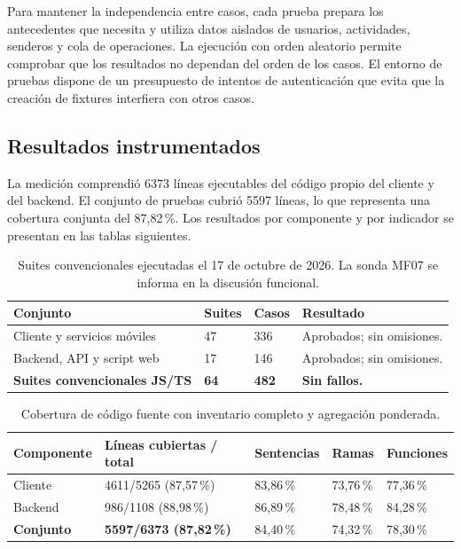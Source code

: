 Para mantener la independencia entre casos, cada prueba prepara los antecedentes que necesita y utiliza datos aislados de usuarios, actividades, senderos y cola de operaciones. La ejecución con orden aleatorio permite comprobar que los resultados no dependan del orden de los casos. El entorno de pruebas dispone de un presupuesto de intentos de autenticación que evita que la creación de fixtures interfiera con otros casos.

\subsection{Resultados instrumentados}

La medición comprendió 6373 líneas ejecutables del código propio del cliente y del backend. El conjunto de pruebas cubrió 5597 líneas, lo que representa una cobertura conjunta del 87{,}82\,\%. Los resultados por componente y por indicador se presentan en las tablas siguientes.

\begin{table}[H]
\centering
\small
\setlength{\tabcolsep}{4pt}
\renewcommand{\arraystretch}{1.15}
\begin{tabular}{|p{4.6cm}|p{2cm}|p{2cm}|p{4cm}|}
\hline
\textbf{Conjunto} & \textbf{Suites} & \textbf{Casos} & \textbf{Resultado} \\
\hline
Cliente y servicios móviles & 47 & 336 & Aprobados; sin omisiones. \\
\hline
Backend, API y script web & 17 & 146 & Aprobados; sin omisiones. \\
\hline
\textbf{Suites convencionales JS/TS} & \textbf{64} & \textbf{482} & \textbf{Sin fallos.} \\
\hline
\end{tabular}
\caption{Suites convencionales ejecutadas el 17 de octubre de 2026. La sonda MF07 se informa en la discusión funcional.}
\label{tab:resultados-pruebas}
\end{table}

\begin{table}[H]
\centering
\small
\setlength{\tabcolsep}{4pt}
\renewcommand{\arraystretch}{1.15}
\begin{tabular}{|p{2.7cm}|p{3.1cm}|p{2cm}|p{2cm}|p{2cm}|}
\hline
\textbf{Componente} & \textbf{Líneas cubiertas / total} & \textbf{Sentencias} & \textbf{Ramas} & \textbf{Funciones} \\
\hline
Cliente & 4611/5265 (87{,}57\,\%) & 83{,}86\,\% & 73{,}76\,\% & 77{,}36\,\% \\
\hline
Backend & 986/1108 (88{,}98\,\%) & 86{,}89\,\% & 78{,}48\,\% & 84{,}28\,\% \\
\hline
\textbf{Conjunto} & \textbf{5597/6373 (87{,}82\,\%)} & 84{,}40\,\% & 74{,}32\,\% & 78{,}30\,\% \\
\hline
\end{tabular}
\caption{Cobertura de código fuente con inventario completo y agregación ponderada.}
\label{tab:cobertura-instrumentada}
\end{table}

